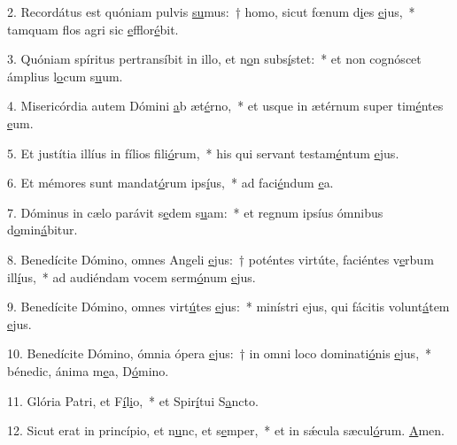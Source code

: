 2. Recordátus est quóniam pulvis \uline{su}mus:~† homo, sicut fœnum d\uline{i}es \uline{e}jus,~* tamquam flos agri sic \uline{e}fflor\uline{é}bit.\par 
3. Quóniam spíritus pertransíbit in illo, et n\uline{o}n subs\uline{í}stet:~* et non cognóscet ámplius l\uline{o}cum s\uline{u}um.\par 
4. Misericórdia autem Dómini \uline{a}b æt\uline{é}rno,~* et usque in ætérnum super tim\uline{é}ntes \uline{e}um.\par 
5. Et justítia illíus in fílios f\uline{i}li\uline{ó}rum,~* his qui servant testam\uline{é}ntum \uline{e}jus.\par 
6. Et mémores sunt mandat\uline{ó}rum ips\uline{í}us,~* ad faci\uline{é}ndum \uline{e}a.\par 
7. Dóminus in cælo parávit s\uline{e}dem s\uline{u}am:~* et regnum ipsíus ómnibus d\uline{o}min\uline{á}bitur.\par 
8. Benedícite Dómino, omnes Angeli \uline{e}jus:~† poténtes virtúte, faciéntes v\uline{e}rbum ill\uline{í}us,~* ad audiéndam vocem serm\uline{ó}num \uline{e}jus.\par 
9. Benedícite Dómino, omnes virt\uline{ú}tes \uline{e}jus:~* minístri ejus, qui fácitis volunt\uline{á}tem \uline{e}jus.\par 
10. Benedícite Dómino, ómnia ópera \uline{e}jus:~† in omni loco dominati\uline{ó}nis \uline{e}jus,~* bénedic, ánima m\uline{e}a, D\uline{ó}mino.\par 
11. Glória Patri, et F\uline{í}l\uline{i}o,~* et Spir\uline{í}tui S\uline{a}ncto.\par 
12. Sicut erat in princípio, et n\uline{u}nc, et s\uline{e}mper,~* et in sǽcula sæcul\uline{ó}rum. \uline{A}men.\par 
